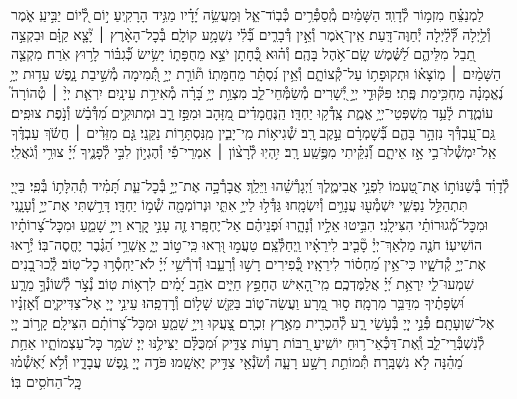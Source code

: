 \documentclass[twoside, openany, parskip=half, 11pt]{book}
\begin{document}
\begin{narrow}
לַמְנַצֵּ֗חַ מִזְמ֥וֹר לְ֯דָוִֽד׃ \hfill \break
הַשָּׁמַ֗יִם מְֽ֯סַפְּ֯רִ֥ים כְּ֯בֽוֹד־אֵ֑ל וּֽמַעֲשֵׂ֥ה יָ֝דָ֗יו מַגִּ֥יד הָרָקִֽיעַ׃
י֣וֹם לְ֭֯יוֹם יַבִּ֣יעַֽ אֹ֑מֶר וְ֯לַ֥יְלָה לְּ֯֝לַ֗יְלָה יְ֯חַוֶּה־דָּֽעַת׃
אֵֽין־אֹ֭מֶר וְ֯אֵ֣ין דְּ֯בָרִ֑ים בְּ֯֝לִ֗י נִשְׁמָ֥ע קוֹלָֽם׃
בְּ֯כׇל־הָאָ֨רֶץ ׀ יָ֘צָ֤א קַוָּ֗ם וּבִקְצֵ֣ה תֵ֭בֵל מִלֵּיהֶ֑ם לַ֝שֶּׁ֗מֶשׁ שָֽׂם־אֹ֥הֶל בָּהֶֽם׃
וְ֯ה֗וּא כְּ֭֯חָתָן יֹצֵ֣א מֵחֻפָּת֑וֹ יָשִׂ֥ישׂ כְּ֯֝גִבּ֗וֹר לָר֥וּץ אֹֽרַח׃
מִקְצֵ֤ה הַשָּׁמַ֨יִם ׀ מֽוֹצָא֗וֹ וּתְקוּפָת֥וֹ עַל־קְ֯צוֹתָ֑ם וְ֯אֵ֥ין נִ֝סְתָּ֗ר מֵחַמָּתֽוֹ׃
תּ֘וֹרַ֤ת יְיָ֣ תְּ֭֯מִימָה מְ֯שִׁ֣יבַת נָ֑פֶשׁ עֵד֥וּת יְיָ֥ נֶ֝אֱמָנָ֗ה מַחְכִּ֥ימַת פֶּֽתִי׃
פִּקּ֘וּדֵ֤י יְיָ֣ יְ֭֯שָׁרִים מְ֯שַׂמְּ֯חֵי־לֵ֑ב מִצְוַ֥ת יְיָ֥ בָּ֝רָ֗ה מְ֯אִירַ֥ת עֵינָֽיִם׃
יִרְאַ֤ת יְיָ֨ ׀ טְ֯הוֹרָה֮ עוֹמֶ֢דֶת לָ֫עַ֥ד מִֽשְׁפְּטֵי־יְיָ֥ אֱמֶ֑ת צָֽדְ֯ק֥וּ יַחְדָּֽו׃
הַֽנֶּחֱמָדִ֗ים מִ֭זָּהָב וּמִפַּ֣ז רָ֑ב וּמְתוּקִ֥ים מִ֝דְּ֯בַ֗שׁ וְ֯נֹ֣פֶת צוּפִֽים׃
גַּֽם־עַ֭בְדְּ֯ךָ נִזְהָ֣ר בָּהֶ֑ם בְּ֯֝שׇׁמְרָ֗ם עֵ֣קֶב רָֽב׃
שְׁ֯גִיא֥וֹת מִֽי־יָבִ֑ין מִֽנִּסְתָּר֥וֹת נַקֵּֽנִי׃
גַּ֤ם מִזֵּדִ֨ים ׀ חֲשֹׂ֬ךְ עַבְדֶּ֗ךָ אַֽל־יִמְשְׁ֯לוּ־בִ֣י אָ֣ז אֵיתָ֑ם וְ֯֝נִקֵּ֗יתִי מִפֶּ֥שַֽׁע רָֽב׃
יִ֥הְיֽוּ לְ֯רָצ֨וֹן ׀ אִמְרֵי־פִ֡י וְ֯הֶגְי֣וֹן לִבִּ֣י לְ֯פָנֶ֑יךָ יְ֝יָ֗ צוּרִ֥י וְ֯גֹאֲלִֽי׃


\enlargethispage{\baselineskip}

לְ֯דָוִ֗ד \hfill
בְּ֯שַׁנּוֹת֣וֹ אֶת־טַ֭עְמוֹ לִפְנֵ֣י אֲבִימֶ֑לֶךְ וַ֝יְגָרְ֯שֵׁ֗הוּ וַיֵּלַֽךְ׃
אֲבָרְ֯כָ֣ה אֶת־יְיָ֣ בְּ֯כׇל־עֵ֑ת תָּ֝מִ֗יד תְּֽ֯הִלָּת֥וֹ בְּ֯פִֽי׃
בַּייָ֭ תִּתְהַלֵּ֣ל נַפְשִׁ֑י יִשְׁמְ֯ע֖וּ עֲנָוִ֣ים וְ֯יִשְׂמָֽחוּ׃
גַּדְּ֯ל֣וּ לַייָ֣ אִתִּ֑י וּנְרוֹמְמָ֖ה שְׁ֯מ֣וֹ יַחְדָּֽו׃
דָּרַ֣שְׁתִּי אֶת־יְיָ֣ וְ֯עָנָ֑נִי וּמִכׇּל־מְ֯֝גוּרוֹתַ֗י הִצִּילָֽנִי׃
הִבִּ֣יטוּ אֵלָ֣יו וְ֯נָהָ֑רוּ וּ֝פְנֵיהֶ֗ם אַל־יֶחְפָּֽרוּ׃
זֶ֤ה עָנִ֣י קָ֭רָא וַייָ֣ שָׁמֵ֑עַ וּמִכׇּל־צָ֝רוֹתָ֗יו הוֹשִׁיעֽוֹ׃
חֹנֶ֤ה מַלְאַךְ־יְיָ֓ סָ֘בִ֤יב לִירֵאָ֗יו וַֽיְחַלְּ֯צֵֽם׃
טַעֲמ֣וּ וּ֭רְאוּ כִּֽי־ט֣וֹב יְיָ֑ אַֽשְׁרֵ֥י הַ֝גֶּ֗בֶר יֶחֱסֶה־בּֽוֹ׃
יְ֯ר֣אוּ אֶת־יְיָ֣ קְ֯דֹשָׁ֑יו כִּי־אֵ֥ין מַ֝חְס֗וֹר לִירֵאָֽיו׃
כְּ֭֯פִירִים רָשׁ֣וּ וְ֯רָעֵ֑בוּ וְ֯דֹרְ֯שֵׁ֥י יְ֝יָ֗ לֹא־יַחְסְ֯ר֥וּ כׇל־טֽוֹב׃
לְֽ֯כוּ־בָ֭נִים שִׁמְעוּ־לִ֑י יִֽרְאַ֥ת יְ֝יָ֗ אֲלַמֶּדְכֶֽם׃
מִֽי־הָ֭אִישׁ הֶחָפֵ֣ץ חַיִּ֑ים אֹהֵ֥ב יָ֝מִ֗ים לִרְא֥וֹת טֽוֹב׃
נְ֯צֹ֣ר לְ֯שׁוֹנְ֯ךָ֣ מֵרָ֑ע וּ֝שְׂפָתֶ֗יךָ מִדַּבֵּ֥ר מִרְמָֽה׃
ס֣וּר מֵ֭רָע וַעֲשֵׂה־ט֑וֹב בַּקֵּ֖שׁ שָׁל֣וֹם וְ֯רׇדְפֵֽהוּ׃
עֵינֵ֣י יְיָ֭ אֶל־צַדִּיקִ֑ים וְ֯֝אׇזְנָ֗יו אֶל־שַׁוְעָתָֽם׃
פְּ֯נֵ֣י יְיָ֭ בְּ֯עֹ֣שֵׂי רָ֑ע לְ֯הַכְרִ֖ית מֵאֶ֣רֶץ זִכְרָֽם׃
צָ֭עֲקוּ וַייָ֣ שָׁמֵ֑עַ וּמִכׇּל־צָ֝רוֹתָ֗ם הִצִּילָֽם׃
קָר֣וֹב יְיָ֭ לְ֯נִשְׁבְּ֯רֵי־לֵ֑ב וְֽ֯אֶת־דַּכְּ֯אֵי־ר֥וּחַ יוֹשִֽׁיעַ׃
רַ֭בּוֹת רָע֣וֹת צַדִּ֑יק וּ֝מִכֻּלָּ֗ם יַצִּילֶ֥נּוּ יְיָ׃
שֹׁמֵ֥ר כׇּל־עַצְמוֹתָ֑יו אַחַ֥ת מֵ֝הֵ֗נָּה לֹ֣א נִשְׁבָּֽרָה׃
תְּ֯מוֹתֵ֣ת רָשָׁ֣ע רָעָ֑ה וְ֯שֹׂנְ֯אֵ֖י צַדִּ֣יק יֶאְשָֽׁמוּ׃
פֹּדֶ֣ה יְיָ֭ נֶ֣פֶשׁ עֲבָדָ֑יו וְ֯לֹ֥א יֶ֝אְשְׁ֯מ֗וּ כׇּֽל־הַחֹסִ֥ים בּֽוֹ׃




\end{narrow}
\end{document}
